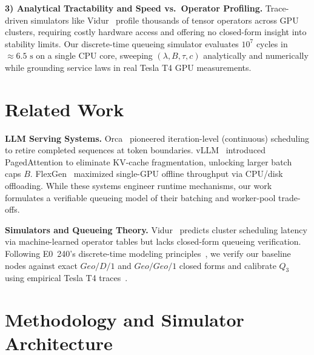 \documentclass[conference]{IEEEtran}
\begin{document}
\textbf{3) Analytical Tractability and Speed vs.\ Operator Profiling.}
Trace-driven simulators like Vidur~\cite{agrawal2024vidur} profile thousands of tensor operators across GPU clusters, requiring costly hardware access and offering no closed-form insight into stability limits. Our discrete-time queueing simulator evaluates $10^7$ cycles in $\approx 6.5\text{ s}$ on a single CPU core, sweeping $(\lambda, B, \tau, c)$ analytically and numerically while grounding service laws in real Tesla T4 GPU measurements.

\section{Related Work}
\textbf{LLM Serving Systems.} Orca~\cite{yu2022orca} pioneered iteration-level (continuous) scheduling to retire completed sequences at token boundaries. vLLM~\cite{kwon2023vllm} introduced PagedAttention to eliminate KV-cache fragmentation, unlocking larger batch caps $B$. FlexGen~\cite{sheng2023flexgen} maximized single-GPU offline throughput via CPU/disk offloading. While these systems engineer runtime mechanisms, our work formulates a verifiable queueing model of their batching and worker-pool trade-offs.

\textbf{Simulators and Queueing Theory.} Vidur~\cite{agrawal2024vidur} predicts cluster scheduling latency via machine-learned operator tables but lacks closed-form queueing verification. Following E0~240's discrete-time modeling principles~\cite{mor2006discrete}, we verify our baseline nodes against exact $Geo/D/1$ and $Geo/Geo/1$ closed forms and calibrate $Q_3$ using empirical Tesla T4 traces~\cite{zheng2023response}.

\section{Methodology and Simulator Architecture}
\end{document}
